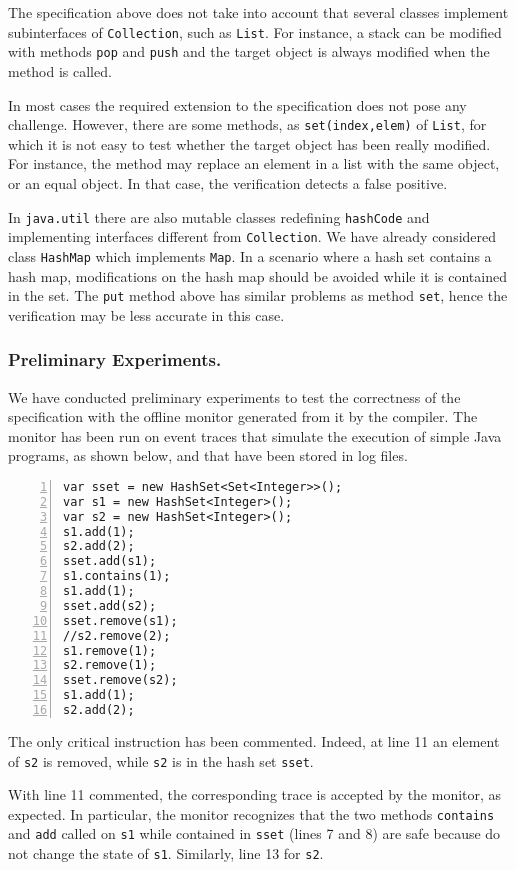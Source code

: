 The specification above does not take into account that several classes implement subinterfaces of \lstinline{Collection}, such as \lstinline{List}.
For instance, a stack can be modified with methods \lstinline{pop} and \lstinline{push} and the target object is always modified when the method is called.

In most cases the required extension to the specification does not pose any challenge. However, there are some methods, as
\lstinline{set(index,elem)} of \lstinline{List}, for which it is not easy to test whether the target object has been really modified.
For instance, the method
may replace an element in a list with the same object, or an equal object. In that case, the verification detects a false positive.

In \lstinline{java.util} there are also mutable classes redefining \lstinline{hashCode} and implementing interfaces different from
\lstinline{Collection}. We have already considered class \lstinline{HashMap} which implements \lstinline{Map}. In a scenario where
a hash set contains a hash map, modifications on the hash map should be avoided while it is contained in the set.
The \lstinline{put} method above has similar problems as method \lstinline{set}, hence the verification may be less accurate in this case.

\subsubsection{Preliminary Experiments.}
We have conducted preliminary experiments to test the correctness of the specification
with the offline monitor generated from it by the \rml compiler.
The monitor has been run on event traces that simulate the  execution of simple Java programs, as shown below, and that have been stored in log files.
\begin{lstlisting}[numbers=left]
var sset = new HashSet<Set<Integer>>();
var s1 = new HashSet<Integer>();
var s2 = new HashSet<Integer>();
s1.add(1);
s2.add(2);
sset.add(s1);
s1.contains(1);
s1.add(1);
sset.add(s2);
sset.remove(s1);
//s2.remove(2);
s1.remove(1);
s2.remove(1);
sset.remove(s2);
s1.add(1);
s2.add(2);
\end{lstlisting}
The only critical instruction has been commented.
Indeed, at line 11 an element of \lstinline{s2} is removed, while \lstinline{s2} is in the hash set \lstinline{sset}.

With line 11 commented, the corresponding trace is accepted by the monitor, as expected.
In particular, the monitor recognizes that the two methods \lstinline{contains} and \lstinline{add} called on \lstinline{s1}
while contained in \lstinline{sset} (lines 7 and 8) are safe because do not change the state of \lstinline{s1}. Similarly, line 13 for
\lstinline{s2}.

